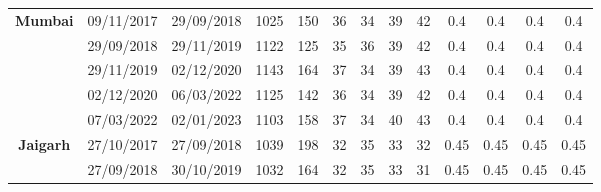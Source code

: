 \begin{table}[]
\begin{tabular}{|c|cc|cc|cccc|cccc|}
\multirow{5}{*}{\textbf{Mumbai}}      & \multicolumn{1}{c|}{09/11/2017}          & 29/09/2018        & \multicolumn{1}{c|}{1025}           & 150           & \multicolumn{1}{c|}{36}     & \multicolumn{1}{c|}{34}     & \multicolumn{1}{c|}{39}     & 42     & \multicolumn{1}{c|}{0.4}    & \multicolumn{1}{c|}{0.4}    & \multicolumn{1}{c|}{0.4}    & 0.4    \\ \cline{2-13} 
                                      & \multicolumn{1}{c|}{29/09/2018}          & 29/11/2019        & \multicolumn{1}{c|}{1122}           & 125           & \multicolumn{1}{c|}{35}     & \multicolumn{1}{c|}{36}     & \multicolumn{1}{c|}{39}     & 42     & \multicolumn{1}{c|}{0.4}    & \multicolumn{1}{c|}{0.4}    & \multicolumn{1}{c|}{0.4}    & 0.4    \\ \cline{2-13} 
                                      & \multicolumn{1}{c|}{29/11/2019}          & 02/12/2020        & \multicolumn{1}{c|}{1143}           & 164           & \multicolumn{1}{c|}{37}     & \multicolumn{1}{c|}{34}     & \multicolumn{1}{c|}{39}     & 43     & \multicolumn{1}{c|}{0.4}    & \multicolumn{1}{c|}{0.4}    & \multicolumn{1}{c|}{0.4}    & 0.4    \\ \cline{2-13} 
                                      & \multicolumn{1}{c|}{02/12/2020}          & 06/03/2022        & \multicolumn{1}{c|}{1125}           & 142           & \multicolumn{1}{c|}{36}     & \multicolumn{1}{c|}{34}     & \multicolumn{1}{c|}{39}     & 42     & \multicolumn{1}{c|}{0.4}    & \multicolumn{1}{c|}{0.4}    & \multicolumn{1}{c|}{0.4}    & 0.4    \\ \cline{2-13} 
                                      & \multicolumn{1}{c|}{07/03/2022}          & 02/01/2023        & \multicolumn{1}{c|}{1103}           & 158           & \multicolumn{1}{c|}{37}     & \multicolumn{1}{c|}{34}     & \multicolumn{1}{c|}{40}     & 43     & \multicolumn{1}{c|}{0.4}    & \multicolumn{1}{c|}{0.4}    & \multicolumn{1}{c|}{0.4}    & 0.4    \\ \hline
\multirow{5}{*}{\textbf{Jaigarh}}     & \multicolumn{1}{c|}{27/10/2017}          & 27/09/2018        & \multicolumn{1}{c|}{1039}           & 198           & \multicolumn{1}{c|}{32}     & \multicolumn{1}{c|}{35}     & \multicolumn{1}{c|}{33}     & 32     & \multicolumn{1}{c|}{0.45}   & \multicolumn{1}{c|}{0.45}   & \multicolumn{1}{c|}{0.45}   & 0.45   \\ \cline{2-13} 
                                      & \multicolumn{1}{c|}{27/09/2018}          & 30/10/2019        & \multicolumn{1}{c|}{1032}           & 164           & \multicolumn{1}{c|}{32}     & \multicolumn{1}{c|}{35}     & \multicolumn{1}{c|}{33}     & 31     & \multicolumn{1}{c|}{0.45}   & \multicolumn{1}{c|}{0.45}   & \multicolumn{1}{c|}{0.45}   & 0.45   \\ \cline{2-13} 

\end{tabular}
\end{table}
